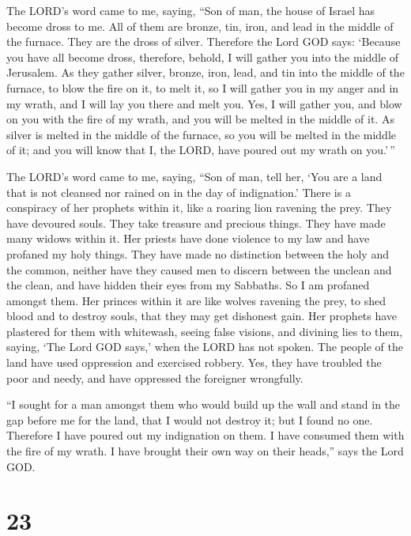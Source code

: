  The LORD's word came to me, saying,  ``Son of
man, the house of Israel has become dross to me. All of them are bronze,
tin, iron, and lead in the middle of the furnace. They are the dross of
silver.  Therefore the Lord GOD says: `Because you have all
become dross, therefore, behold, I will gather you into the middle of
Jerusalem.  As they gather silver, bronze, iron, lead, and
tin into the middle of the furnace, to blow the fire on it, to melt it,
so I will gather you in my anger and in my wrath, and I will lay you
there and melt you.  Yes, I will gather you, and blow on
you with the fire of my wrath, and you will be melted in the middle of
it.  As silver is melted in the middle of the furnace, so
you will be melted in the middle of it; and you will know that I, the
LORD, have poured out my wrath on you.'\,''

 The LORD's word came to me, saying,  ``Son of
man, tell her, `You are a land that is not cleansed nor rained on in the
day of indignation.'  There is a conspiracy of her prophets
within it, like a roaring lion ravening the prey. They have devoured
souls. They take treasure and precious things. They have made many
widows within it.  Her priests have done violence to my law
and have profaned my holy things. They have made no distinction between
the holy and the common, neither have they caused men to discern between
the unclean and the clean, and have hidden their eyes from my Sabbaths.
So I am profaned amongst them.  Her princes within it are
like wolves ravening the prey, to shed blood and to destroy souls, that
they may get dishonest gain.  Her prophets have plastered
for them with whitewash, seeing false visions, and divining lies to
them, saying, `The Lord GOD says,' when the LORD has not spoken.
 The people of the land have used oppression and exercised
robbery. Yes, they have troubled the poor and needy, and have oppressed
the foreigner wrongfully.

 ``I sought for a man amongst them who would build up the
wall and stand in the gap before me for the land, that I would not
destroy it; but I found no one.  Therefore I have poured
out my indignation on them. I have consumed them with the fire of my
wrath. I have brought their own way on their heads,'' says the Lord GOD.

\hypertarget{section-21}{%
\section{23}\label{section-21}}

